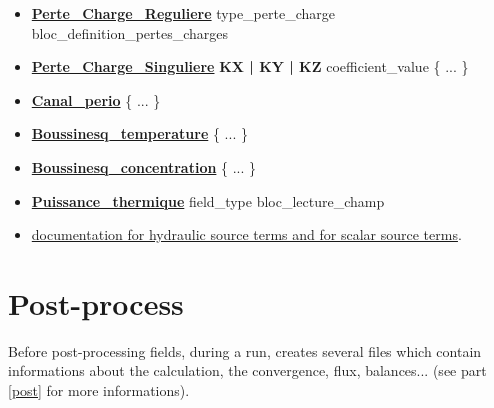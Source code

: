 \begin{itemize}
\item \href{\REFERENCEMANUAL\#pertechargereguliere}{\textbf{Perte\_Charge\_Reguliere}} type\_perte\_charge bloc\_definition\_pertes\_charges
\item \href{\REFERENCEMANUAL\#pertechargesinguliere}{\textbf{Perte\_Charge\_Singuliere}} \textbf{KX | KY | KZ} coefficient\_value \{ ... \} 
\item \href{\REFERENCEMANUAL\#canalperio}{\textbf{Canal\_perio}} \{ ... \} 
\item \href{\REFERENCEMANUAL\#boussinesqtemperature}{\textbf{Boussinesq\_temperature}} \{ ... \}
\item \href{\REFERENCEMANUAL\#boussinesqconcentration}{\textbf{Boussinesq\_concentration}} \{ ... \}
\item \href{\REFERENCEMANUAL\#puissancethermique}{\textbf{Puissance\_thermique}} field\_type   bloc\_lecture\_champ 
\item \href{\REFERENCEMANUAL\#sourcebase}{documentation for hydraulic source terms and for scalar source terms}.
\end{itemize}





\section{Post-process}

Before post-processing fields, during a run, \trust creates several files which contain informations about the calculation, the convergence, flux, balances... (see part \ref{post} for more informations).\\

